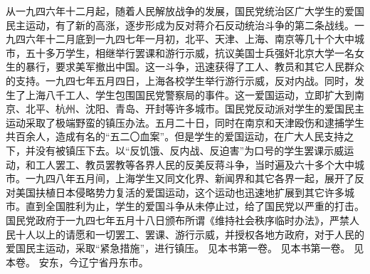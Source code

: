 \begin{maonote}
从一九四六年十二月起，随着人民解放战争的发展，国民党统治区广大学生的爱国民主运动，有了新的高涨，逐步形成为反对蒋介石反动统治斗争的第二条战线。一九四六年十二月底到一九四七年一月初，北平、天津、上海、南京等几十个大中城市，五十多万学生，相继举行罢课和游行示威，抗议美国士兵强奸北京大学一名女生的暴行，要求美军撤出中国。这一斗争，迅速获得了工人、教员和其它人民群众的支持。一九四七年五月四日，上海各校学生举行游行示威，反对内战。同时，发生了上海八千工人、学生包围国民党警察局的事件。这一爱国运动，立即扩大到南京、北平、杭州、沈阳、青岛、开封等许多城市。国民党反动派对学生的爱国民主运动采取了极端野蛮的镇压办法。五月二十日，同时在南京和天津殴伤和逮捕学生共百余人，造成有名的“五二〇血案”。但是学生的爱国运动，在广大人民支持之下，并没有被镇压下去。以“反饥饿、反内战、反迫害”为口号的学生罢课示威运动，和工人罢工、教员罢教等各界人民的反美反蒋斗争，当时遍及六十多个大中城市。一九四八年五月间，上海学生又同文化界、新闻界和其它各界一起，展开了反对美国扶植日本侵略势力复活的爱国运动，这个运动也迅速地扩展到其它许多城市。直到全国胜利为止，学生的爱国斗争从未停止过，给了国民党以严重的打击。
国民党政府于一九四七年五月十八日颁布所谓《维持社会秩序临时办法》，严禁人民十人以上的请愿和一切罢工、罢课、游行示威，并授权各地方政府，对于人民的爱国民主运动，采取“紧急措施”，进行镇压。
见本书第一卷。
见本书第一卷。
见本卷。
安东，今辽宁省丹东市。
\end{maonote}
